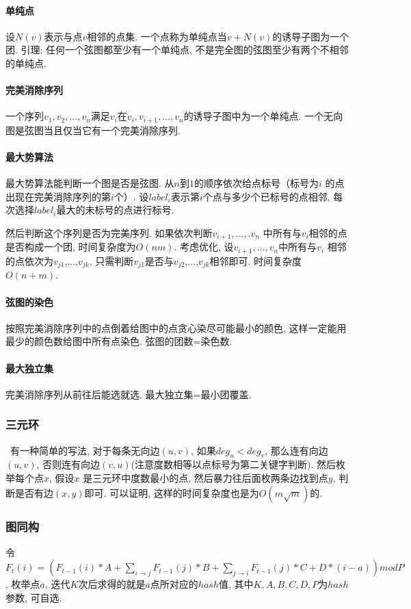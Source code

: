 				\paragraph{单纯点}设$N(v)$表示与点$v$相邻的点集. 一个点称为单纯点当${v}+N(v)$的诱导子图为一个团. 引理: 任何一个弦图都至少有一个单纯点, 不是完全图的弦图至少有两个不相邻的单纯点. 
				\paragraph{完美消除序列}一个序列${v_1,v_2,...,v_n}$满足$v_i$在${v_i,v_{i+1},...,v_n}$的诱导子图中为一个单纯点. 一个无向图是弦图当且仅当它有一个完美消除序列. 
				\paragraph{最大势算法}最大势算法能判断一个图是否是弦图. 从$n$到$1$的顺序依次给点标号（标号为$i$ 的点出现在完美消除序列的第$i$个）. 设$label_i$表示第$i$个点与多少个已标号的点相邻, 每次选择$label_i$最大的未标号的点进行标号. 
				\par 然后判断这个序列是否为完美序列. 如果依次判断${v_{i+1},...,.v_n}$ 中所有与$v_i$相邻的点是否构成一个团, 时间复杂度为$O(nm)$. 考虑优化, 设${v_{i+1},...,v_n}$中所有与$v_i$ 相邻的点依次为$v_{j1}$,...,$v_{jk}$.  只需判断$v_{j1}$是否与$v_{j2}$,...,$v_{jk}$相邻即可. 时间复杂度$O(n+m)$. 
				\paragraph{弦图的染色}按照完美消除序列中的点倒着给图中的点贪心染尽可能最小的颜色, 这样一定能用最少的颜色数给图中所有点染色. 弦图的团数=染色数. 
                \paragraph{最大独立集}完美消除序列从前往后能选就选. 最大独立集=最小团覆盖. 
\subsubsection{三元环}\
                有一种简单的写法, 对于每条无向边$(u,v)$, 如果$deg_u<deg_v$, 那么连有向边$(u,v)$, 否则连有向边$(v,u)$(注意度数相等以点标号为第二关键字判断). 然后枚举每个点$x$, 假设$x$ 是三元环中度数最小的点, 然后暴力往后面枚两条边找到点$y$, 判断是否有边$(x,y)$即可. 可以证明, 这样的时间复杂度也是为$O(m\sqrt{m})$的. 
\subsubsection{图同构}
                令$F_t(i)=(F_{t-1}(i)*A+\sum_{i\to j} F_{t-1}(j)*B+\sum_{j\to i} F_{t-1}(j)*C+D*(i-a))mod P$, 枚举点$a$, 迭代$K$次后求得的就是$a$点所对应的$hash$值, 其中$K,A,B,C,D,P$为$hash$参数, 可自选. 


